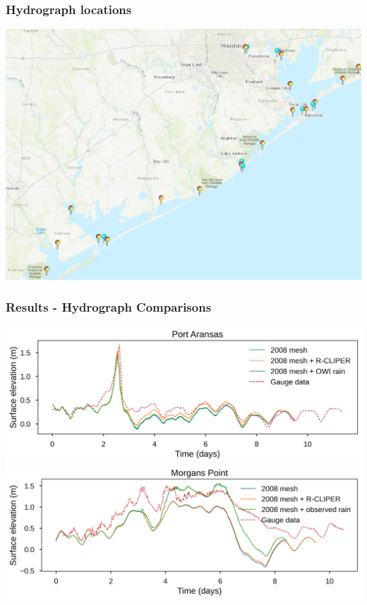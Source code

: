\documentclass[10pt]{oden_beamer}
\begin{document}
\begin{frame}
  \frametitle{Hydrograph locations}
  \centering
  \includegraphics[width=0.9\linewidth]{stations.png}
\end{frame}


\begin{frame}
  \frametitle{Results - Hydrograph Comparisons}
  \centering
  \includegraphics[width=0.9\linewidth]{port_aransas.png}
  \centering
  \includegraphics[width=0.9\linewidth]{morgans_point.png}
\end{frame}
\end{document}
